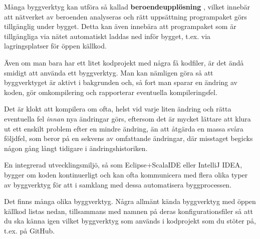 Många byggverktyg kan utföra så kallad \textbf{beroendeupplösning} , vilket innebär att nätverket av beroenden analyseras och rätt uppsättning programpaket görs tillgänglig under bygget. Detta kan även innebära att programpaket som är tillgängliga via nätet automatiskt laddas ned inför bygget, t.ex. via lagringsplatser för öppen källkod.   

Även om man bara har ett litet kodprojekt med några få kodfiler, är det ändå smidigt att använda ett byggverktyg. Man kan nämligen göra så att byggverktyget är aktivt i bakgrunden och, så fort man sparar en ändring av koden, gör omkompilering och rapporterar eventuella kompileringsfel.

Det är klokt att kompilera om ofta, helst vid varje liten ändring och rätta eventuella fel \textit{innan} nya ändringar görs, eftersom det är mycket lättare att klura ut ett enskilt problem efter en mindre ändring, än att åtgärda en massa svåra följdfel, som beror på en sekvens av omfattande ändringar, där misstaget begicks någon gång långt tidigare i ändringshistoriken. 

En integrerad utvecklingsmiljö, så som Eclipse+ScalaIDE eller IntelliJ IDEA, bygger om koden kontinuerligt och kan ofta kommunicera med flera olika typer av byggverktyg för att i samklang med dessa automatisera byggprocessen.

Det finns många olika byggverktyg. Några allmänt kända byggverktyg med öppen källkod listas nedan, tillsammans med namnen på deras konfigurationsfiler så att du ska känna igen vilket byggverktyg som används i  kodprojekt som du stöter på, t.ex. på GitHub.

